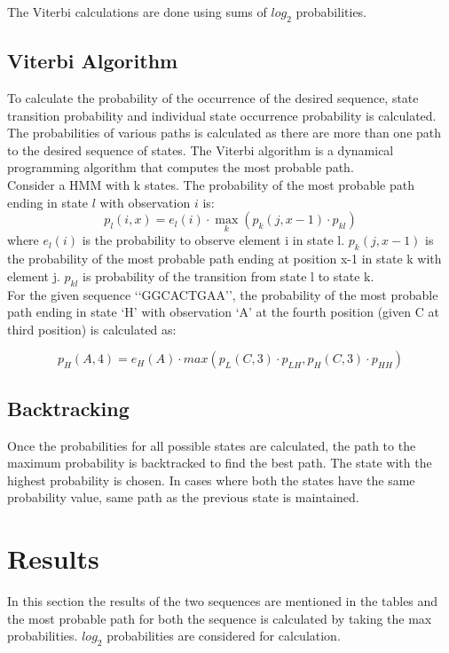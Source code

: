 \documentclass[12pt]{article}
\begin{document}
The Viterbi calculations are done using sums of $log_2$ probabilities.
\subsection{Viterbi Algorithm}
To calculate the probability of the occurrence of the desired sequence, state transition probability and individual state occurrence probability is calculated. The probabilities of various paths is calculated as there are more than one path to the desired sequence of states. The Viterbi algorithm is a dynamical programming algorithm that computes the most probable path. \\

Consider a HMM with k states. The probability of the most probable path ending in state $l$ with observation $i$ is: 
\begin{equation}
	p_l(i,x) = e_l(i) \cdot \displaystyle\max_k(p_k(j,x-1) \cdot p_{kl})
\end{equation}
where $e_l(i)$ is the  probability to observe element i in state l. $p_k(j,x-1)$ is the probability of the most probable path ending at position x-1 in state k with element j. $p_{kl}$ is probability of the transition from state l to state k. \\

For the given sequence \lq\lq{GGCACTGAA}\rq\rq{}, the probability of the most probable path ending in state \lq{H}\rq{} with observation \lq{A}\rq{} at the fourth position (given C at third position) is calculated as:

\begin{equation}
	p_H(A,4) = e_H(A) \cdot max(p_L(C,3) \cdot p_{LH}, p_H(C,3) \cdot p_{HH} )
\end{equation}
\subsection{Backtracking}
Once the probabilities for all possible states are calculated, the path to the maximum probability is backtracked to find the best path. The state with the highest probability is chosen. In cases where both the states have the same probability value, same path as the previous state is maintained. 
\section{Results}
In this section the results of the two sequences are mentioned in the tables and the most probable path for both the sequence is calculated by taking the max probabilities. $log_2$ probabilities are considered for calculation.
\end{document}
